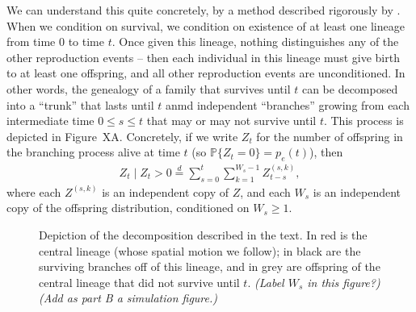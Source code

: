 \documentclass{article}
\renewcommand{\P}{\mathbb{P}}
\newcommand{\deq}{\stackrel{\scriptscriptstyle{d}}{=}}
\newcommand{\plr}[1]{{\it\color{blue}(#1)}}
\begin{document}
We can understand this quite concretely, by a method described rigorously by \citet{geiger1999elementary}.
When we condition on survival, we condition on existence of at least one lineage from time $0$ to time $t$.
Once given this lineage, nothing distinguishes any of the other reproduction events --
then each individual in this lineage must give birth to at least one offspring,
and all other reproduction events are unconditioned.
In other words, the genealogy of a family that survives until $t$
can be decomposed into a ``trunk'' that lasts until $t$
anmd independent ``branches'' growing from each intermediate time $0\le s \le t$ 
that may or may not survive until $t$.
This process is depicted in Figure~XA.
Concretely, if we write $Z_t$ for the number of offspring in the branching process alive at time $t$
(so $\P\{Z_t = 0\} = p_e(t)$),
then
\begin{align}
  Z_t \; \vert \; Z_t>0 \deq \sum_{s=0}^t \sum_{k=1}^{W_s-1} Z^{(s,k)}_{t-s},
\end{align}
where each $Z^{(s,k)}$ is an independent copy of $Z$,
and each $W_s$ is an independent copy of the offspring distribution, conditioned on $W_s \ge 1$.

\begin{figure}[ht!!]
  \begin{center}
  
  \end{center}
\caption{Depiction of the decomposition described in the text.
In red is the central lineage (whose spatial motion we follow);
in black are the surviving branches off of this lineage, 
and in grey are offspring of the central lineage that did not survive until $t$.
\plr{Label $W_s$ in this figure?}
\plr{Add as part B a simulation figure.}
\label{fig:branching_decomp}
}
\end{figure}
\end{document}
